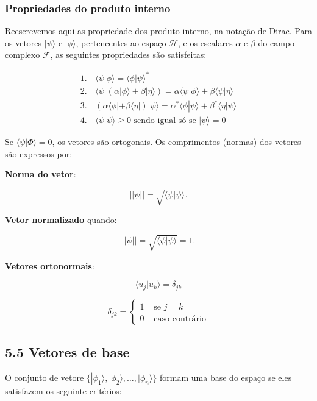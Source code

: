 \documentclass[11pt]{article}
\begin{document}
\hypertarget{propriedades-do-produto-interno}{%
\subsubsection{Propriedades do produto
interno}\label{propriedades-do-produto-interno}}

Reescrevemos aqui as propriedade dos produto interno, na notação de
Dirac. Para os vetores \(|\psi\rangle\) e \(|\phi\rangle\), pertencentes
ao espaço \(\mathcal{H}\), e os escalares \(\alpha\) e \(\beta\) do
campo complexo \(\mathcal{F}\), as seguintes propriedades são
satisfeitas:

\[\begin{array}{ll}
1.\, &\langle\psi|\phi\rangle = \langle\phi|\psi\rangle ^* \\
2.\, &\langle\psi|(\alpha|\phi\rangle+\beta|\eta\rangle) = 
  \alpha\langle\psi|\phi\rangle + \beta\langle\psi|\eta\rangle \\
3.\, &(\alpha\langle\phi| +\beta\langle\eta|)|\psi\rangle = 
  \alpha^*\langle\phi|\psi\rangle + \beta^*\langle\eta|\psi\rangle \\
4.\, &\langle\psi|\psi\rangle \ge 0 \textrm{   sendo igual só se } 
|\psi \rangle = 0 \end{array}\]

Se \(\langle\psi|\Phi\rangle=0\), os vetores são ortogonais. Os
comprimentos (normas) dos vetores são expressos por:

\textbf{Norma do vetor}:

\[||\psi|| = \sqrt{\langle\psi|\psi\rangle}.\]

\textbf{Vetor normalizado} quando:

\[||\psi|| = \sqrt{\langle\psi|\psi\rangle}=1.\]

\textbf{Vetores ortonormais}:

\[\langle u_j | u_k \rangle = \delta_{jk}\]

\[ \delta_{jk} = \left\{ \begin{array}{c} 1 & \textrm{ se }j=k \\ 0 & \textrm{ caso contrário}\end{array}  \right. \]

    \hypertarget{vetores-de-base}{%
\subsection{5.5 Vetores de base}\label{vetores-de-base}}

O conjunto de vetore
\(\{ |\phi_1\rangle, |\phi_2\rangle, \dots,|\phi_n\rangle \}\) formam
uma base do espaço se eles satisfazem os seguinte critérios:
\end{document}
